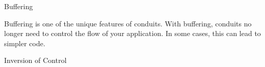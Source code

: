 % 
% 
% 
% 
Buffering

Buffering is one of the unique features of conduits. With buffering, conduits no longer
need to
control the flow of your application. In some cases, this can lead to simpler code.

Inversion of Control

